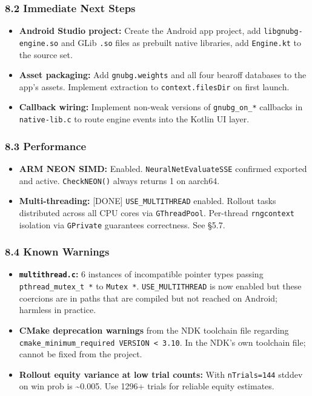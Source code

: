 \documentclass[11pt,a4paper]{article}
\providecommand{\tightlist}{\setlength{\itemsep}{2pt}\setlength{\parskip}{0pt}}
\begin{document}
\subsubsection{8.2 Immediate Next Steps}\label{immediate-next-steps}

\begin{itemize}
\tightlist
\item
  \textbf{Android Studio project:} Create the Android app project, add
  \texttt{libgnubg-engine.so} and GLib \texttt{.so} files as prebuilt
  native libraries, add \texttt{Engine.kt} to the source set.
\item
  \textbf{Asset packaging:} Add \texttt{gnubg.weights} and all four
  bearoff databases to the app's assets. Implement extraction to
  \texttt{context.filesDir} on first launch.
\item
  \textbf{Callback wiring:} Implement non-weak versions of
  \texttt{gnubg\_on\_*} callbacks in \texttt{native-lib.c} to route
  engine events into the Kotlin UI layer.
\end{itemize}

\subsubsection{8.3 Performance}\label{performance}

\begin{itemize}
\tightlist
\item
  \textbf{ARM NEON SIMD:} Enabled. \texttt{NeuralNetEvaluateSSE}
  confirmed exported and active. \texttt{CheckNEON()} always returns 1
  on aarch64.
\item
  \textbf{Multi-threading:} {[}DONE{]} \texttt{USE\_MULTITHREAD}
  enabled. Rollout tasks distributed across all CPU cores via
  \texttt{GThreadPool}. Per-thread \texttt{rngcontext} isolation via
  \texttt{GPrivate} guarantees correctness. See §5.7.
\end{itemize}

\subsubsection{8.4 Known Warnings}\label{known-warnings}

\begin{itemize}
\tightlist
\item
  \textbf{\texttt{multithread.c}:} 6 instances of incompatible pointer
  types passing \texttt{pthread\_mutex\_t\ *} to \texttt{Mutex\ *}.
  \texttt{USE\_MULTITHREAD} is now enabled but these coercions are in
  paths that are compiled but not reached on Android; harmless in
  practice.
\item
  \textbf{CMake deprecation warnings} from the NDK toolchain file
  regarding
  \texttt{cmake\_minimum\_required\ VERSION\ \textless{}\ 3.10}. In the
  NDK's own toolchain file; cannot be fixed from the project.
\item
  \textbf{Rollout equity variance at low trial counts:} With
  \texttt{nTrials=144} stddev on win prob is \textasciitilde0.005. Use
  1296+ trials for reliable equity estimates.
\end{itemize}
\end{document}
